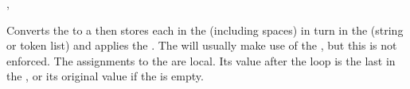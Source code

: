 \documentclass[oneside]{book}
\begin{document}
\begin{function}{\strMapVariable,\strMapVariable}
\begin{syntax}
   
   
\end{syntax}
Converts the  to a  then stores each
 in the  (including spaces) in turn in
the (string or token list)  and applies the
.  The  will usually make use of the
, but this is not enforced.  The assignments to the
 are local.  Its value after the loop is the last
 in the , or its original value if the
 is empty.
\begin{demohigh}
\IgnoreSpacesOn
\strClear \lTmpaStr
{} \lTmpiStr {
  \strPutRight \lTmpaStr {\expWhole {[\lTmpiStr]}}
}
\strUse \lTmpaStr
\IgnoreSpacesOff
\end{demohigh}
\end{function}

%
\end{document}
